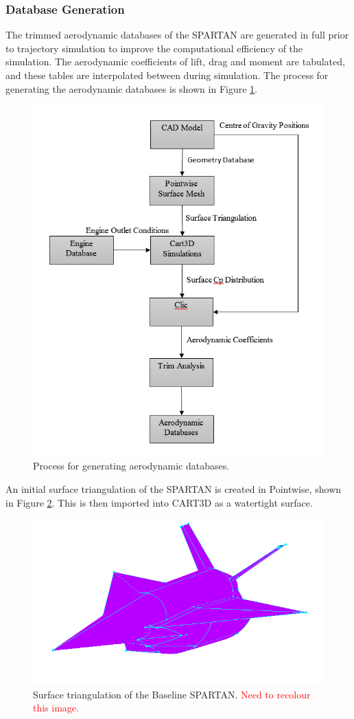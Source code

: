 		\subsubsection{Database Generation}
		The trimmed aerodynamic databases of the SPARTAN are generated in full prior to trajectory simulation to improve the computational efficiency of the simulation. The aerodynamic coefficients of lift, drag and moment are tabulated, and these tables are interpolated between during simulation. 
The process for generating the aerodynamic databases is shown in Figure \ref{fig:FlowChart}. 
				\begin{figure}[ht]
					\centering
					\includegraphics[width=0.7\linewidth]{figures/3_vehicle_design/FlowChart}
					\caption{Process for generating aerodynamic databases.}
					\label{fig:FlowChart}
				\end{figure}
		An initial surface triangulation of the SPARTAN is created in Pointwise, shown in Figure \ref{fig:Pointwise}. This is then imported into CART3D as a watertight surface. 
				\begin{figure}[ht]
					\centering
					\includegraphics[width=0.6\linewidth]{figures/3_vehicle_design/Pointwise}
					\caption{Surface triangulation of the Baseline SPARTAN. \textcolor{red}{Need to recolour this image.}}
					\label{fig:Pointwise}
				\end{figure}
